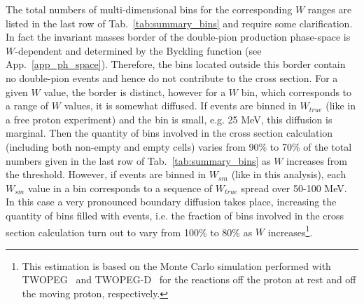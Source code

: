 The total numbers of multi-dimensional bins for the corresponding $W$ ranges are listed in the last row of Tab.~\ref{tab:summary_bins} and require some clarification. In fact the invariant masses border of the double-pion production phase-space is $W$-dependent and determined by the Byckling function (see App.~\ref{app_ph_space}). Therefore, the bins located outside this border contain no double-pion events and hence do not contribute to the cross section. For a given $W$ value, the border is distinct, however for a $W$ bin, which corresponds to a range of $W$ values, it is somewhat diffused. If events are binned in $W_{true}$ (like in a free proton experiment) and the bin is small, e.g. 25 MeV, this diffusion is marginal. Then the quantity of bins involved in the cross section calculation (including both non-empty and empty cells) varies from 90\% to 70\% of the total numbers given in the last row of Tab.~\ref{tab:summary_bins} as $W$ increases from the threshold. However, if events are binned in $W_{sm}$ (like in this analysis), each $W_{sm}$ value in a bin corresponds to a sequence of $W_{true}$ spread over 50-100 MeV. In this case a very pronounced boundary diffusion takes place, increasing the quantity of bins filled with events, i.e. the fraction of bins involved in the cross section calculation turn out to vary from 100\% to 80\% as $W$ increases\footnote[8]{This estimation is based on the Monte Carlo simulation performed with TWOPEG~\cite{twopeg} and TWOPEG-D~\cite{twopeg-d} for the reactions off the proton at rest and off the moving proton, respectively.}.




